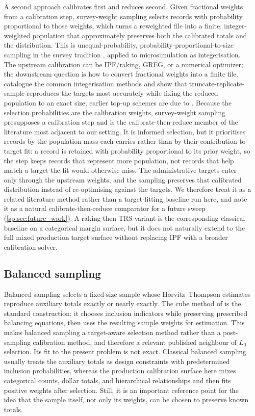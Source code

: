 A second approach calibrates first and reduces second. Given fractional weights from a calibration
step, survey-weight sampling selects records with probability proportional to those weights, which
turns a reweighted file into a finite, integer-weighted population that approximately preserves both
the calibrated totals and the distribution. This is unequal-probability,
probability-proportional-to-size sampling in the survey tradition \citep{hansen1943, horvitz1952},
applied to microsimulation as integerisation. The upstream calibration can be IPF/raking, GREG, or a
numerical optimizer; the downstream question is how to convert fractional weights into a finite file.
\citet{lovelace2013trs} catalogue the common integerisation methods and show that
truncate-replicate-sample reproduces the targets most accurately while fixing the reduced population
to an exact size; earlier top-up schemes are due to \citet{ballas2005}. Because the selection
probabilities are the calibration weights, survey-weight sampling presupposes a calibration step and is
the calibrate-then-reduce member of the literature most adjacent to our setting. It is informed
selection, but it prioritises records by the population mass each carries rather than by their
contribution to target fit: a record is retained with probability proportional to its prior weight, so
the step keeps records that represent more population, not records that help match a target the fit would
otherwise miss. The administrative targets enter only through the upstream weights, and the sampling
preserves that calibrated distribution instead of re-optimising against the targets. We therefore treat
it as a related literature method rather than a
target-fitting baseline run here, and note it as a natural calibrate-then-reduce comparator for a future
sweep (\autoref{sp:sec:future_work}). A raking-then-TRS variant is the corresponding classical baseline
on a categorical margin surface, but it does not naturally extend to the full mixed production target
surface without replacing IPF with a broader calibration solver.

\subsection{Balanced sampling}

Balanced sampling selects a fixed-size sample whose Horvitz--Thompson estimates reproduce auxiliary
totals exactly or nearly exactly. The cube method of \citet{deville2004cube} is the standard
construction: it chooses inclusion indicators while preserving prescribed balancing equations, then
uses the resulting sample weights for estimation. This makes balanced sampling a target-aware
selection method rather than a post-sampling calibration method, and therefore a relevant published
neighbour of $L_0$ selection. Its fit to the present problem is not exact. Classical balanced sampling
usually treats the auxiliary totals as design constraints with predetermined inclusion probabilities,
whereas the production calibration surface here mixes categorical counts, dollar totals, and
hierarchical relationships and then fits positive weights after selection. Still, it is an important
reference point for the idea that the sample itself, not only its weights, can be chosen to preserve
known totals.

